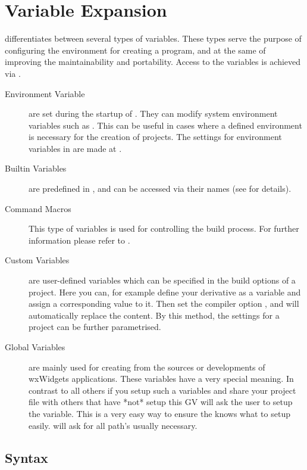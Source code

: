 \chapter{Variable Expansion}\label{sec:variables_types}

\codeblocks differentiates between several types of variables. These types serve the purpose of configuring the environment for creating a program, and at the same of improving the maintainability and portability. Access to the \codeblocks variables is achieved via .


\begin{description}
\item[Environment Variable] are set during the startup of \codeblocks. They can modify system environment variables such as . This can be useful in cases where a defined environment is necessary for the creation of projects. The settings for environment variables in \codeblocks are made at .
\item[Builtin Variables] are predefined in \codeblocks, and can be accessed via their names  (see  for details).
\item[Command Macros] This type of variables is used for controlling the build process. For further information please refer to .
\item[Custom Variables] are user-defined variables which can be specified in the build options of a project. Here you can, for example define your derivative as a variable  and assign a corresponding value to it. Then set the compiler option , and \codeblocks will automatically replace the content. By this method, the settings for a project can be further parametrised.
\item[Global Variables] are mainly used for creating \codeblocks from the sources or developments of wxWidgets applications. These variables have a very special meaning. In contrast to all others if you setup such a variables and share your project file with others that have *not* setup this GV \codeblocks will ask the user to setup the variable. This is a very easy way to ensure the  knows what to setup easily. \codeblocks will ask for all path's usually necessary.
\end{description}

\section{Syntax}

